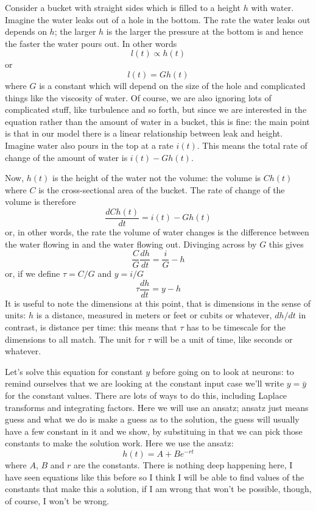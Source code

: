 \documentclass{article}
\begin{document}
Consider a bucket with straight sides which is filled to a height $h$
with water. Imagine the water leaks out of a hole in the bottom. The
rate the water leaks out depends on $h$; the larger $h$ is the larger
the pressure at the bottom is and hence the faster the water pours
out. In other words
\begin{equation}
l(t)\propto h(t)
\end{equation}
or 
\begin{equation}
l(t)= G h(t)
\end{equation}
where $G$ is a constant which will depend on the size of the hole and
complicated things like the viscosity of water. Of course, we are also
ignoring lots of complicated stuff, like turbulence and so forth, but
since we are interested in the equation rather than the amount of
water in a bucket, this is fine: the main point is that in our model
there is a linear relationship between leak and height. Imagine water
also pours in the top at a rate $i(t)$. This means the total rate of
change of the amount of water is $i(t)-Gh(t)$.

Now, $h(t)$ is the height of the water not the volume: the volume is
$Ch(t)$ where $C$ is the cross-sectional area of the bucket. The rate
of change of the volume is therefore
\begin{equation}
\frac{dCh(t)}{dt}=i(t)-Gh(t)
\end{equation}
or, in other words, the rate the volume of water changes is the difference between the water flowing in and the water flowing out. Divinging across by $G$ this gives
\begin{equation}
\frac{C}{G}\frac{dh}{dt}=\frac{i}{G}-h
\end{equation}
or, if we define $\tau=C/G$ and $y=i/G$
\begin{equation}
\tau\frac{dh}{dt}=y-h
\end{equation}
It is useful to note the dimensions at this point, that is dimensions
in the sense of units: $h$ is a distance, measured in meters or feet
or cubits or whatever, $dh/dt$ in contrast, is distance per time: this
means that $\tau$ has to be timescale for the dimensions to all match. The unit for $\tau$ will be a unit of time, like seconds or whatever.

Let's solve this equation for constant $y$ before going on to look at
neurons: to remind ourselves that we are looking at the constant input
case we'll write $y=\bar{y}$ for the constant values. There are lots
of ways to do this, including Laplace transforms and integrating
factors.  Here we will use an ansatz; ansatz just means guess and what
we do is make a guess as to the solution, the guess will usually have
a few constant in it and we show, by substituing in that we can pick
those constants to make the solution work. Here we use the ansatz:
\begin{equation}
  h(t) = A+ Be^{-rt}
\end{equation}
where $A$, $B$ and $r$ are the constants. There is nothing deep
happening here, I have seen equations like this before so I think I
will be able to find values of the constants that make this a
solution, if I am wrong that won't be possible, though, of course, I
won't be wrong.
\end{document}
